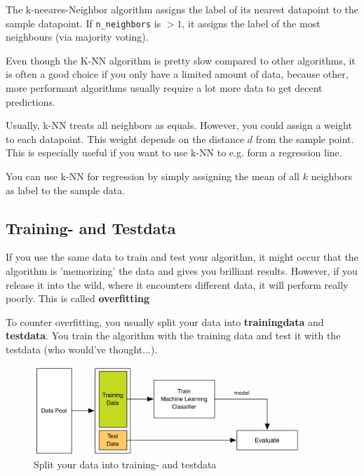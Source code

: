 \documentclass[a4paper, 11pt]{article}
\newcommand{\code}[1]{\texttt{#1}}
\begin{document}
The k-neeares-Neighbor algorithm assigns the label of its nearest datapoint to the sample datapoint. If \code{n\_neighbors} is $>1$, it assigns the label of the most neighbours (via majority voting).

\vspace{10px}

Even though the K-NN algorithm is pretty slow compared to other algorithms, it is often a good choice if you only have a limited amount of data, because other, more performant algorithms usually require a lot more data to get decent predictions.

Usually, k-NN treats all neighbors as equals. However, you could assign a weight to each datapoint. This weight depends on the distance $d$ from the sample point. This is especially useful if you want to use k-NN to e.g. form a regression line.

You can use k-NN for regression by simply assigning the mean of all $k$ neighbors as label to the sample data.

\subsection{Training- and Testdata}
If you use the same data to train and test your algorithm, it might occur that the algorithm is 'memorizing' the data and gives you brilliant results. However, if you release it into the wild, where it encounters different data, it will perform really poorly. This is called \textbf{overfitting}

To counter overfitting, you usually split your data into \textbf{trainingdata} and \textbf{testdata}. You train the algorithm with the training data and test it with the testdata (who would've thought...). 

\begin{figure}[htb!]
    \centering
    \includegraphics[keepaspectratio=true,width=0.9\textwidth]{training_testdata.png}
    \caption{Split your data into training- and testdata}
    \label{fig:training_testdata}
\end{figure}
\end{document}
